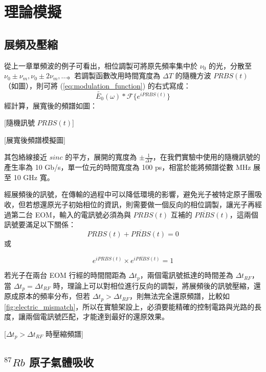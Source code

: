 \documentclass[class=NCU_thesis, crop=false]{standalone}
\begin{document}
\chapter{理論模擬}
\section{展頻及壓縮}
從上一章單頻波的例子可看出，相位調製可將原先頻率集中於 $\nu_{0}$ 的光，分散至 $\nu_{0}\pm\nu_{m}, \nu_{0}\pm2\nu_{m},\dots$。若調製函數改用時間寬度為 $\Delta T$ 的隨機方波 $PRBS(t)$ （如圖），則可將 (\ref{eq:modulation_function}) 的右式寫成：
\begin{equation}
    \tilde{E_{0}}(\omega)*\mathscr{F}\{{e^{i PRBS(t)}}\}
\end{equation}
經計算，展寬後的頻譜如圖：

[隨機訊號 $PRBS(t)$]

[展寬後頻譜模擬圖]

其包絡線接近 $sinc$ 的平方，展開的寬度為 $\pm\frac{1}{\Delta T}$，在我們實驗中使用的隨機訊號的產生率為 10 Gb/s，單一位元的時間寬度為 100 ps，相當於能將頻譜從數 MHz 展至 10 GHz 寬。

經展頻後的訊號，在傳輸的過程中可以降低環境的影響，避免光子被特定原子團吸收，但若想還原光子初始相位的資訊，則需要做一個反向的相位調製，讓光子再經過第二台 EOM，輸入的電訊號必須為與 $PRBS(t)$ 互補的 $\overline{PRBS}(t)$，這兩個訊號要滿足以下關係：
\begin{equation}
    PRBS(t)+\overline{PRBS}(t)=0
\end{equation}
或

\begin{equation}
    e^{i PRBS(t)}\times e^{i \overline{PRBS}(t)}=1
\end{equation}

若光子在兩台 EOM 行經的時間間距為 $\Delta t_{p}$，兩個電訊號抵達的時間差為 $\Delta t_{RF}$，當 $\Delta t_{p}=\Delta t_{RF}$ 時，理論上可以對相位進行反向的調製，將展頻後的訊號壓縮，還原成原本的頻率分布，但若 $\Delta t_{p}>\Delta t_{RF}$，則無法完全還原頻譜，比較如\cref{fig:electric_mismatch}，所以在實驗架設上，必須要能精確的控制電路與光路的長度，讓兩個電訊號匹配，才能達到最好的還原效果。

[$\Delta t_{p}>\Delta t_{RF}$ 時壓縮頻譜]

\section{$^{87}Rb$ 原子氣體吸收}
\end{document}
